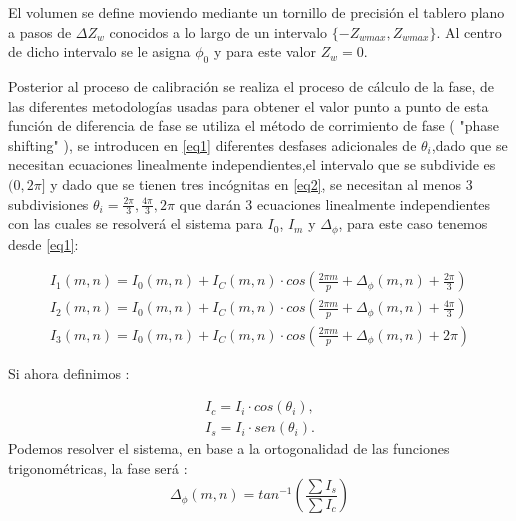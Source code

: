 \documentclass[UTF8]{article}
\begin{document}
El volumen se define moviendo mediante un tornillo de precisión el tablero plano a pasos de $\Delta Z_{w}$ conocidos a lo largo de un intervalo $\{-Z_{wmax},Z_{wmax}\}$. Al centro de dicho intervalo se le asigna $\phi_{0}$ y para este valor $Z_{w}=0$.
\medskip

Posterior al proceso de calibración se realiza el proceso de cálculo de la fase, de las diferentes metodologías usadas para obtener el valor punto a punto de esta función de diferencia de fase se utiliza el método de corrimiento de fase ( "phase shifting" ), se introducen en \ref{eq1} diferentes desfases adicionales de $\theta_{i}$,dado que se necesitan ecuaciones linealmente independientes,el intervalo que se subdivide es $(0,2\pi]$ y dado que se tienen tres incógnitas en \ref{eq2}, se necesitan al menos 3 subdivisiones $\theta_{i}=\frac{2\pi}{3},\frac{4\pi}{3},2\pi$ que darán 3 ecuaciones linealmente independientes con las cuales se resolverá el sistema para $I_{0}$, $I_{m}$ y $\Delta_{\phi}$, para este caso tenemos desde \ref{eq1}:
\medskip

\begin{eqnarray}
 I_{1}(m,n) = I_{0}(m,n) + I_{C}(m,n)\cdot cos\left( \frac{2\pi m}{p}+ \Delta_{\phi}(m,n)+\frac{2\pi}{3}\right)
 \\
 I_{2}(m,n) = I_{0}(m,n) + I_{C}(m,n)\cdot cos\left( \frac{2\pi m}{p}+ \Delta_{\phi}(m,n)+\frac{4\pi}{3}\right)
 \\
 I_{3}(m,n) = I_{0}(m,n) + I_{C}(m,n)\cdot cos\left( \frac{2\pi m}{p}+ \Delta_{\phi}(m,n)+2\pi\right)
\end{eqnarray}

Si ahora definimos :
\medskip

\begin{align}
I_{c} = I_{i}\cdot cos( \theta_{i}),
\\
I_{s} = I_{i}\cdot sen( \theta_{i}).
\end{align}
%
Podemos resolver el sistema, en base a la ortogonalidad de las funciones trigonométricas, la fase será : 
\medskip
\begin{equation}
\Delta_{\phi}(m,n) =tan^{-1}\left( \frac{\sum I_{s}}{\sum I_{c}}\right) 
\end{equation}
\end{document}
